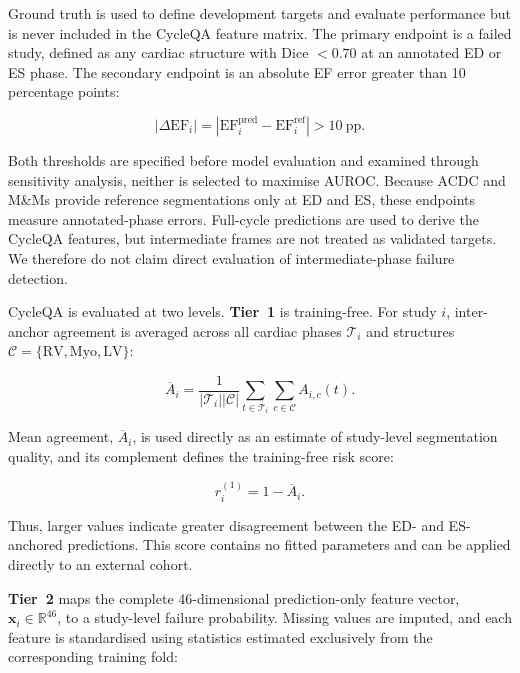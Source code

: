 \documentclass[runningheads]{llncs}
\newcommand{\CQ}{CycleQA}
\begin{document}
Ground truth is used to define development targets and evaluate performance but is never included in the \CQ{} feature matrix. The primary endpoint is a failed study, defined as any cardiac structure with Dice $<0.70$ at an annotated ED or ES phase. The secondary endpoint is an absolute EF error greater than 10 percentage points:

\begin{equation}
|\Delta\mathrm{EF}_i|
=
\left|
\mathrm{EF}^{\mathrm{pred}}_i
-
\mathrm{EF}^{\mathrm{ref}}_i
\right|
>10~\mathrm{pp}.
\end{equation}

Both thresholds are specified before model evaluation and examined through sensitivity analysis, neither is selected to maximise AUROC. Because ACDC and M\&Ms provide reference segmentations only at ED and ES, these endpoints measure annotated-phase errors. Full-cycle predictions are used to derive the \CQ{} features, but intermediate frames are not treated as validated targets. We therefore do not claim direct evaluation of intermediate-phase failure detection.

\CQ{} is evaluated at two levels. \textbf{Tier~1} is training-free. For study $i$, inter-anchor agreement is averaged across all cardiac phases $\mathcal{T}_i$ and structures $\mathcal{C}=\{\mathrm{RV},\mathrm{Myo},\mathrm{LV}\}$:

\begin{equation}
\overline{A}_i
=
\frac{1}{|\mathcal{T}_i||\mathcal{C}|}
\sum_{t\in\mathcal{T}_i}
\sum_{c\in\mathcal{C}}
A_{i,c}(t).
\end{equation}

Mean agreement, $\overline{A}_i$, is used directly as an estimate of study-level segmentation quality, and its complement defines the training-free risk score:

\begin{equation}
r_i^{(1)}=1-\overline{A}_i.
\end{equation}

Thus, larger values indicate greater disagreement between the ED- and ES-anchored predictions. This score contains no fitted parameters and can be applied directly to an external cohort.

\textbf{Tier~2} maps the complete 46-dimensional prediction-only feature vector, $\mathbf{x}_i\in\mathbb{R}^{46}$, to a study-level failure probability. Missing values are imputed, and each feature is standardised using statistics estimated exclusively from the corresponding training fold:
\end{document}
